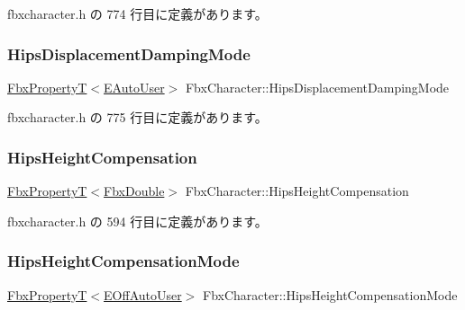  fbxcharacter.\+h の 774 行目に定義があります。

\mbox{\label{class_fbx_character_ae322e9c6be19ec69fa236846625ec791}} 
\subsubsection{\texorpdfstring{Hips\+Displacement\+Damping\+Mode}{HipsDisplacementDampingMode}}
{\footnotesize\ttfamily \hyperlink{class_fbx_property_t}{Fbx\+PropertyT}$<$\hyperlink{class_fbx_character_a5b03462709a82a15d89ee4563a4c49df}{E\+Auto\+User}$>$ Fbx\+Character\+::\+Hips\+Displacement\+Damping\+Mode}



 fbxcharacter.\+h の 775 行目に定義があります。

\mbox{\label{class_fbx_character_afa6965f25d485e48fcde6fb77a102096}} 
\subsubsection{\texorpdfstring{Hips\+Height\+Compensation}{HipsHeightCompensation}}
{\footnotesize\ttfamily \hyperlink{class_fbx_property_t}{Fbx\+PropertyT}$<$\hyperlink{fbxtypes_8h_a171e72a1c46fc15c1a6c9c31948c1c5b}{Fbx\+Double}$>$ Fbx\+Character\+::\+Hips\+Height\+Compensation}



 fbxcharacter.\+h の 594 行目に定義があります。

\mbox{\label{class_fbx_character_a935d82d838ca32350e157f080d10d896}} 
\subsubsection{\texorpdfstring{Hips\+Height\+Compensation\+Mode}{HipsHeightCompensationMode}}
{\footnotesize\ttfamily \hyperlink{class_fbx_property_t}{Fbx\+PropertyT}$<$\hyperlink{class_fbx_character_ab698a180e6f900ba8317257749c2ecce}{E\+Off\+Auto\+User}$>$ Fbx\+Character\+::\+Hips\+Height\+Compensation\+Mode}



